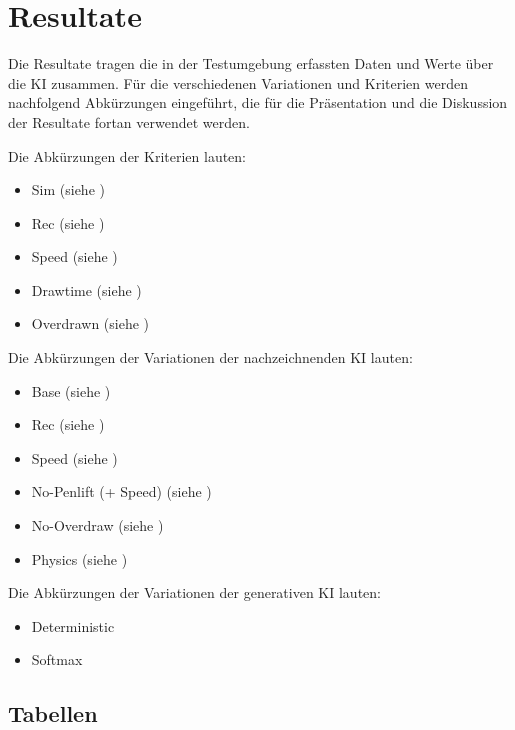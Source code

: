\chapter{Resultate}\label{chap:r} 

Die Resultate tragen die in der Testumgebung erfassten Daten und Werte über die
KI zusammen. Für die verschiedenen Variationen und Kriterien werden nachfolgend
Abkürzungen eingeführt, die für die Präsentation und die Diskussion der
Resultate fortan verwendet werden.

Die Abkürzungen der Kriterien lauten:
\begin{itemize}
    \item Sim (siehe )
    \item Rec (siehe )
    \item Speed (siehe )
    \item Drawtime  (siehe )
    \item Overdrawn (siehe )
\end{itemize}

Die Abkürzungen der Variationen der nachzeichnenden KI lauten: 
\begin{itemize}
    \item Base (siehe )
    \item Rec (siehe )
    \item Speed (siehe )
    \item No-Penlift (+ Speed) (siehe )
    \item No-Overdraw (siehe )
    \item Physics (siehe )
\end{itemize}

Die Abkürzungen der Variationen der generativen KI lauten:
\begin{itemize}
    \item Deterministic
    \item Softmax
\end{itemize}





\section{Tabellen}\label{chap:r_tab} 

